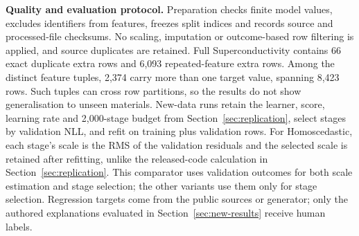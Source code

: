 \textbf{Quality and evaluation protocol.}
Preparation checks finite model values, excludes identifiers from features, freezes split indices and records source and processed-file checksums.
No scaling, imputation or outcome-based row filtering is applied, and source duplicates are retained.
Full Superconductivity contains 66 exact duplicate extra rows and 6{,}093 repeated-feature extra rows.
Among the distinct feature tuples, 2{,}374 carry more than one target value, spanning 8{,}423 rows.
Such tuples can cross row partitions, so the results do not show generalisation to unseen materials.
New-data runs retain the learner, score, learning rate and 2{,}000-stage budget from Section~\ref{sec:replication}, select stages by validation NLL, and refit on training plus validation rows.
For Homoscedastic, each stage's scale is the RMS of the validation residuals and the selected scale is retained after refitting, unlike the released-code calculation in Section~\ref{sec:replication}.
This comparator uses validation outcomes for both scale estimation and stage selection; the other variants use them only for stage selection.
Regression targets come from the public sources or generator; only the authored explanations evaluated in Section~\ref{sec:new-results} receive human labels.
